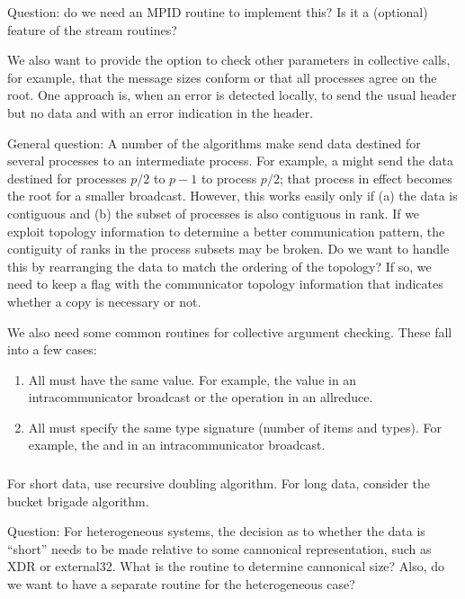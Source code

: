 \documentclass{article}
\begin{document}
Question: do we need an MPID routine to implement this? Is it a
(optional) feature of the stream routines?

We also want to provide the option to check other parameters in
collective calls, for example, that the message sizes conform or that
all processes agree on the root.  One approach is, when an error is
detected locally, to send the usual header but no data and with an
error indication in the header.

General question:  A number of the algorithms make send data destined
for several processes to an intermediate process.  For example, a
 might send the data destined for processes $p/2$
to $p-1$ to process $p/2$; that process in effect becomes the root for
a smaller broadcast.  However, this works easily only if (a) the data
is contiguous and (b) the subset of processes is also contiguous in
rank.  If we exploit topology information to determine a better
communication pattern, the contiguity of ranks in the process subsets
may be broken.  Do we want to handle this by rearranging the data to
match the ordering of the topology?  If so, we need to keep a flag
with the communicator topology information that indicates whether a copy is
necessary or not. 

We also need some common routines for collective argument checking.  These
fall into a few cases:
\begin{enumerate}
\item All must have the same value.  For example, the  value in an
  intracommunicator broadcast or the operation in an allreduce.
\item All must specify the same type signature (number of items and types).
  For example, the  and  in an intracommunicator
  broadcast.
\end{enumerate}

\subsubsection{}
For short data, use recursive doubling algorithm.  For long data, consider the
bucket brigade algorithm.

Question:  For heterogeneous systems, the decision as to whether the
data is ``short'' needs to be made relative to some cannonical
representation, such as XDR or external32.  What is the routine to
determine cannonical size?  Also, do we want to have a separate routine for
the heterogeneous case?
\end{document}
